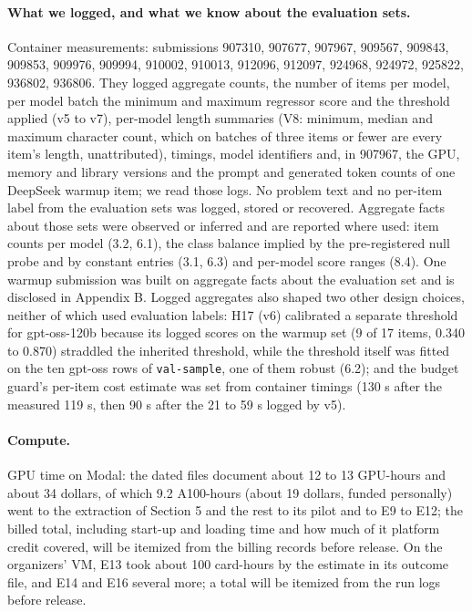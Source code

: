 \paragraph{What we logged, and what we know about the evaluation sets.}
Container measurements: submissions 907310, 907677, 907967, 909567, 909843, 909853, 909976, 909994, 910002, 910013, 912096, 912097, 924968, 924972, 925822, 936802, 936806. They logged aggregate counts, the number of items per model, per model batch the minimum and maximum regressor score and the threshold applied (v5 to v7), per-model length summaries (V8: minimum, median and maximum character count, which on batches of three items or fewer are every item's length, unattributed), timings, model identifiers and, in 907967, the GPU, memory and library versions and the prompt and generated token counts of one DeepSeek warmup item; we read those logs. No problem text and no per-item label from the evaluation sets was logged, stored or recovered. Aggregate facts about those sets were observed or inferred and are reported where used: item counts per model (3.2, 6.1), the class balance implied by the pre-registered null probe and by constant entries (3.1, 6.3) and per-model score ranges (8.4). One warmup submission was built on aggregate facts about the evaluation set and is disclosed in Appendix B. Logged aggregates also shaped two other design choices, neither of which used evaluation labels: H17 (v6) calibrated a separate threshold for gpt-oss-120b because its logged scores on the warmup set (9 of 17 items, 0.340 to 0.870) straddled the inherited threshold, while the threshold itself was fitted on the ten gpt-oss rows of \texttt{val-sample}, one of them robust (6.2); and the budget guard's per-item cost estimate was set from container timings (130 s after the measured 119 s, then 90 s after the 21 to 59 s logged by v5).

\paragraph{Compute.}
GPU time on Modal: the dated files document about 12 to 13 GPU-hours and about 34 dollars, of which 9.2 A100-hours (about 19 dollars, funded personally) went to the extraction of Section 5 and the rest to its pilot and to E9 to E12; the billed total, including start-up and loading time and how much of it platform credit covered, will be itemized from the billing records before release. On the organizers' VM, E13 took about 100 card-hours by the estimate in its outcome file, and E14 and E16 several more; a total will be itemized from the run logs before release.

